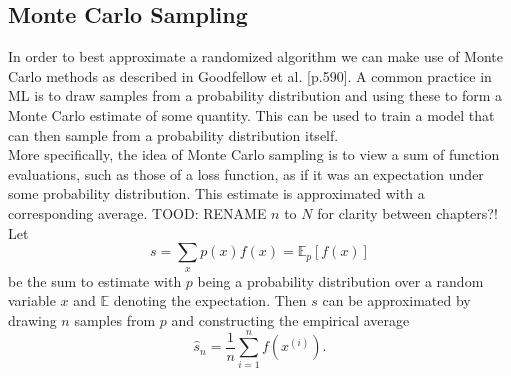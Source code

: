 \subsection{Monte Carlo Sampling}
In order to best approximate a randomized algorithm we can make use of Monte Carlo methods as described in Goodfellow et al. \cite{Goodfellow-et-al-2016}[p.590]. A common practice in ML is to draw samples from a probability distribution and using these to form a Monte Carlo estimate of some quantity. This can be used to train a model that can then sample from a probability distribution itself. \\
More specifically, the idea of Monte Carlo sampling is to view a sum of function evaluations, such as those of a loss function, as if it was an expectation under some probability distribution. This estimate is approximated with a corresponding average. TOOD: RENAME $n$ to $N$ for clarity between chapters?!
Let 
\begin{equation}
    s = \sum_x p(x)f(x)=\mathbb{E}_p[f(x)]
\end{equation}
be the sum to estimate with $p$ being a probability distribution over a random variable $x$ and $\mathbb{E}$ denoting the expectation. Then $s$ can be approximated by drawing $n$ samples from $p$ and constructing the empirical average 
\begin{equation}
    \hat{s}_n=\frac{1}{n}\sum_{i=1}^n f(x^{(i)}).
\end{equation}


